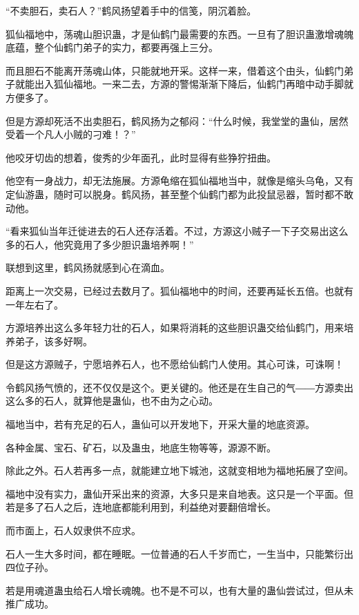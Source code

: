 
\begin{this_body}

“不卖胆石，卖石人？”鹤风扬望着手中的信笺，阴沉着脸。

狐仙福地中，荡魂山胆识蛊，才是仙鹤门最需要的东西。一旦有了胆识蛊激增魂魄底蕴，整个仙鹤门弟子的实力，都要再强上三分。

而且胆石不能离开荡魂山体，只能就地开采。这样一来，借着这个由头，仙鹤门弟子就能出入狐仙福地。一来二去，方源的警惕渐渐下降后，仙鹤门再暗中动手脚就方便多了。

但是方源却死活不出卖胆石，鹤风扬为之郁闷：“什么时候，我堂堂的蛊仙，居然受着一个凡人小贼的刁难！？”

他咬牙切齿的想着，俊秀的少年面孔，此时显得有些狰狞扭曲。

他空有一身战力，却无法施展。方源龟缩在狐仙福地当中，就像是缩头乌龟，又有定仙游蛊，随时可以脱身。鹤风扬，甚至整个仙鹤门都为此投鼠忌器，暂时都不敢动他。

“看来狐仙当年迁徙进去的石人还存活着。不过，方源这小贼子一下子交易出这么多的石人，他究竟用了多少胆识蛊培养啊！”

联想到这里，鹤风扬就感到心在滴血。

距离上一次交易，已经过去数月了。狐仙福地中的时间，还要再延长五倍。也就有一年左右了。

方源培养出这么多年轻力壮的石人，如果将消耗的这些胆识蛊交给仙鹤门，用来培养弟子，该多好啊。

但是这方源贼子，宁愿培养石人，也不愿给仙鹤门人使用。其心可诛，可诛啊！

令鹤风扬气愤的，还不仅仅是这个。更关键的。他还是在生自己的气――方源卖出这么多的石人，就算他是蛊仙，也不由为之心动。

福地当中，若有充足的石人，蛊仙可以开发地下，开采大量的地底资源。

各种金属、宝石、矿石，以及蛊虫，地底生物等等，源源不断。

除此之外。石人若再多一点，就能建立地下城池，这就变相地为福地拓展了空间。

福地中没有实力，蛊仙开采出来的资源，大多只是来自地表。这只是一个平面。但若是多了石人之后，连地底都能利用到，利益绝对要翻倍增长。

而市面上，石人奴隶供不应求。

石人一生大多时间，都在睡眠。一位普通的石人千岁而亡，一生当中，只能繁衍出四位子孙。

若是用魂道蛊虫给石人增长魂魄。也不是不可以，也有大量的蛊仙尝试过，但从未推广成功。


\end{this_body}
